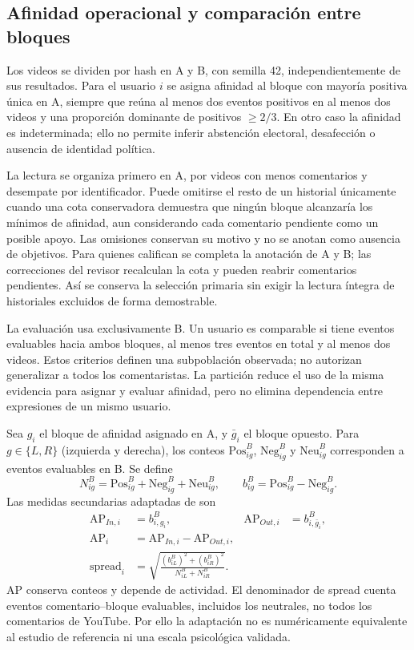 \documentclass[conference,letterpaper]{IEEEtran}
\newcommand{\pos}{\mathrm{Pos}}
\newcommand{\negc}{\mathrm{Neg}}
\newcommand{\neu}{\mathrm{Neu}}
\begin{document}
\subsection{Afinidad operacional y comparación entre bloques}
Los videos se dividen por hash en A y B, con semilla 42, independientemente de sus resultados. Para el usuario $i$ se asigna afinidad al bloque con mayoría positiva única en A, siempre que reúna al menos dos eventos positivos en al menos dos videos y una proporción dominante de positivos $\geq2/3$. En otro caso la afinidad es indeterminada; ello no permite inferir abstención electoral, desafección o ausencia de identidad política.

La lectura se organiza primero en A, por videos con menos comentarios y desempate por identificador. Puede omitirse el resto de un historial únicamente cuando una cota conservadora demuestra que ningún bloque alcanzaría los mínimos de afinidad, aun considerando cada comentario pendiente como un posible apoyo. Las omisiones conservan su motivo y no se anotan como ausencia de objetivos. Para quienes califican se completa la anotación de A y B; las correcciones del revisor recalculan la cota y pueden reabrir comentarios pendientes. Así se conserva la selección primaria sin exigir la lectura íntegra de historiales excluidos de forma demostrable.

La evaluación usa exclusivamente B. Un usuario es comparable si tiene eventos evaluables hacia ambos bloques, al menos tres eventos en total y al menos dos videos. Estos criterios definen una subpoblación observada; no autorizan generalizar a todos los comentaristas. La partición reduce el uso de la misma evidencia para asignar y evaluar afinidad, pero no elimina dependencia entre expresiones de un mismo usuario.

Sea $g_i$ el bloque de afinidad asignado en A, y $\bar g_i$ el bloque opuesto. Para $g\in\{L,R\}$ (izquierda y derecha), los conteos $\pos^B_{ig}$, $\negc^B_{ig}$ y $\neu^B_{ig}$ corresponden a eventos evaluables en B. Se define
\begin{equation}
N^B_{ig}=\pos^B_{ig}+\negc^B_{ig}+\neu^B_{ig},\qquad
b^B_{ig}=\pos^B_{ig}-\negc^B_{ig}.
\end{equation}
Las medidas secundarias adaptadas de \cite{polariz} son
\begin{align}
\mathrm{AP}_{In,i}&=b^B_{i,g_i}, &
\mathrm{AP}_{Out,i}&=b^B_{i,\bar g_i},\\
\mathrm{AP}_i&=\mathrm{AP}_{In,i}-\mathrm{AP}_{Out,i},\label{eq:ap}\\
\mathrm{spread}_i&=\sqrt{\frac{(b^B_{iL})^2+(b^B_{iR})^2}{N^B_{iL}+N^B_{iR}}}.\label{eq:spread}
\end{align}
AP conserva conteos y depende de actividad. El denominador de spread cuenta eventos comentario--bloque evaluables, incluidos los neutrales, no todos los comentarios de YouTube. Por ello la adaptación no es numéricamente equivalente al estudio de referencia ni una escala psicológica validada.
\end{document}
